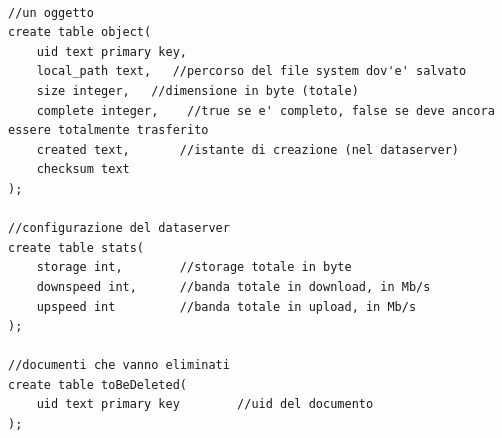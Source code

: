\documentclass{article}
\begin{document}
\begin{lstlisting}[title=Struttura]

//un oggetto
create table object(
    uid text primary key,
    local_path text,   //percorso del file system dov'e' salvato
    size integer,   //dimensione in byte (totale)
    complete integer,    //true se e' completo, false se deve ancora essere totalmente trasferito
    created text,       //istante di creazione (nel dataserver)
    checksum text
);

//configurazione del dataserver
create table stats(
    storage int,        //storage totale in byte
    downspeed int,      //banda totale in download, in Mb/s
    upspeed int         //banda totale in upload, in Mb/s 
);

//documenti che vanno eliminati
create table toBeDeleted(
    uid text primary key        //uid del documento
);


\end{lstlisting}
\end{document}

